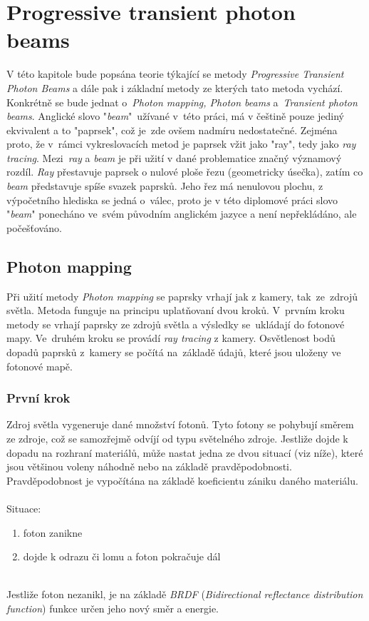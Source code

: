 \chapter{Progressive transient photon beams}
\label{teorie-vr}
V této kapitole bude popsána teorie týkající se metody \textit{Progressive Transient Photon Beams} a dále pak i základní metody ze kterých tato metoda vychází. Konkrétně se bude jednat o~\textit{Photon mapping, Photon beams} a~\textit{Transient photon beams}. Anglické slovo "\textit{beam}"~užívané v~této práci, má v češtině pouze jediný ekvivalent a to "paprsek", což je~zde ovšem nadmíru nedostatečné. Zejména proto, že v~rámci vykreslovacích metod je paprsek vžit jako "ray", tedy jako \textit{ray tracing}. Mezi~\textit{ray} a \textit{beam} je při užití v dané problematice značný významový rozdíl. \textit{Ray} přestavuje paprsek o nulové ploše řezu (geometricky úsečka), zatím co \textit{beam} představuje spíše svazek paprsků. Jeho řez má nenulovou plochu, z výpočetního hlediska se jedná o~válec, proto je v této diplomové práci slovo "\textit{beam}" ponecháno ve~svém původním anglickém jazyce a není nepřekládáno, ale počešťováno.      
\section{Photon mapping}\label{pm}
Při užití metody \textit{Photon mapping} se paprsky vrhají jak z kamery, tak~ze~zdrojů světla. Metoda funguje na principu uplatňovaní dvou kroků. V~prvním kroku metody se vrhají paprsky ze zdrojů světla a výsledky se~ukládají do fotonové mapy. Ve~druhém kroku se provádí \textit{ray tracing} z kamery. Osvětlenost bodů dopadů paprsků z~kamery se počítá na~základě údajů, které jsou uloženy ve fotonové mapě.
\subsection{První krok}
Zdroj světla vygeneruje dané množství fotonů. Tyto fotony se pohybují směrem ze zdroje, což se samozřejmě odvíjí od typu světelného zdroje. Jestliže dojde k dopadu na rozhraní materiálů, může nastat jedna ze dvou situací (viz níže), které jsou většinou voleny náhodně nebo na základě pravděpodobnosti. Pravděpodobnost je vypočítána na základě koeficientu zániku daného materiálu.\\
\\ 
Situace:
\begin{enumerate}
    \item foton zanikne
    \item dojde k odrazu či lomu a foton pokračuje dál 
\end{enumerate}
\\ 
Jestliže foton nezanikl, je na základě \textit{BRDF} (\textit{Bidirectional reflectance distribution function}) funkce určen jeho nový směr a energie\cite{photon_mapping}.\\ 

